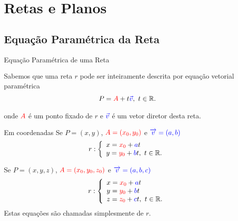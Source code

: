\section{Retas e Planos}

\subsection*{Equação Paramétrica da Reta}


\begin{frame}[label=retas]{Equação Paramétrica de uma Reta}


Sabemos que uma reta $r$ pode ser inteiramente descrita por {\color{blue} equação vetorial paramétrica}
\[P={\color{red}A}+t{\color{blue}\vec{v}},\ t\in \mathbb{R}.\]
	\begin{center}
	\end{center}
onde ${\color{red} A}$ é um ponto fixado de $r$ e  ${\color{blue}\vec{v}}$ é um vetor diretor desta reta.
	
\end{frame}

\begin{frame}[label=retas]{Em coordenadas}
Se	$P=(x,y)$, $\textcolor{red}{A=(x_0,y_0)}$ e $\textcolor{blue}{\overrightarrow{v}=(a,b)}$
\[	r: \left\{\begin{array}{l}
	x=\textcolor{red}{x_0}+\textcolor{blue}{a}t\\
	y=\textcolor{red}{y_0}+\textcolor{blue}{b}t,\  t\in \mathbb{R}.
	\end{array}\right.\]

Se 	$P=(x,y,z)$, $\textcolor{red}{A=(x_0,y_0,z_0)}$ e $\textcolor{blue}{\overrightarrow{v}=(a,b,c)}$
		\[r:	\left\{\begin{array}{l}
		x=\textcolor{red}{x_0}+\textcolor{blue}{a}t\\
		y=\textcolor{red}{y_0}+\textcolor{blue}{b}t\\
		z=\textcolor{red}{z_0}+\textcolor{blue}{c}t,\  t\in \mathbb{R}.
		\end{array}\right.\]
		Estas equações são chamadas simplesmente de  $r$.


\end{frame}


